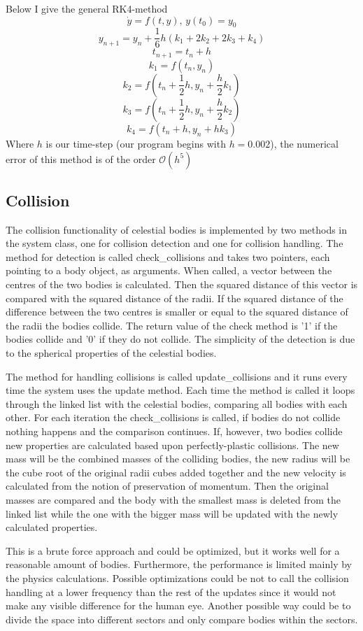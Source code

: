 \documentclass[a4paper,12pt]{article} \usepackage{graphicx}
\begin{document}
Below I give the general RK4-method
\[
\dot{y}=f(t,y),\,y(t_0)=y_0
\]
\[
y_{n+1} = y_n + \frac{1}{6}h\left( k_1 + 2k_2 + 2k_3 + k_4\right)
\]
\[
t_{n+1} = t_n +h
\]
\[
k_1 = f(t_n,y_n)
\]
\[
k_2 = f(t_n + \frac{1}{2}h,y_n + \frac{h}{2}k_1)
\]
\[
k_3 = f(t_n + \frac{1}{2}h,y_n + \frac{h}{2}k_2)
\]
\[
k_4 = f(t_n + h,y_n + hk_3)
\]
Where $h$ is our time-step (our program begins with $h = 0.002$), the numerical
error of this method is of the order $\mathcal{O}(h^5)$

\subsection{Collision}
The collision functionality of celestial bodies is implemented by two methods
in the system class, one for collision detection and one for collision
handling. The method for detection is called check\_collisions and takes two
pointers, each pointing to a body object, as arguments. When called, a vector
between the centres of the two bodies is calculated. Then the squared distance
of this vector is compared with the squared distance of the radii. If the
squared distance of the difference between the two centres is smaller or equal
to the squared distance of the radii the bodies collide. The return value of
the check method is '1' if the bodies collide and '0' if they do not collide.
The simplicity of the detection is due to the spherical properties of the
celestial bodies.

The method for handling collisions is called update\_collisions and it runs
every time the system uses the update method. Each time the method is called it
loops through the linked list with the celestial bodies, comparing all bodies
with each other. For each iteration the check\_collisions is called, if bodies
do not collide nothing happens and the comparison continues. If, however, two
bodies collide new properties are calculated based upon perfectly-plastic
collisions. The new mass will be the combined masses of the colliding bodies,
the new radius will be the cube root of the original radii cubes added together
and the new velocity is calculated from the notion of preservation of momentum.
Then the original masses are compared and the body with the smallest mass is
deleted from the linked list while the one with the bigger mass will be updated
with the newly calculated properties.

This is a brute force approach and could be optimized, but it works well for a
reasonable amount of bodies. Furthermore, the performance is limited mainly by
the physics calculations. Possible optimizations could be not to call the
collision handling at a lower frequency than the rest of the updates since it
would not make any visible difference for the human eye. Another possible way
could be to divide the space into different sectors and only compare bodies
within the sectors. 
\end{document}
